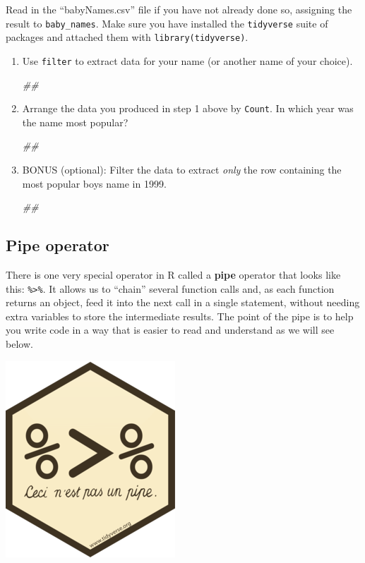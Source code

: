\documentclass[
]{book}
\newenvironment{Shaded}{\begin{snugshade}}{\end{snugshade}}
\newcommand{\CommentTok}[1]{\textcolor[rgb]{0.56,0.35,0.01}{\textit{#1}}}
\begin{document}
Read in the ``babyNames.csv'' file if you have not already done so,
assigning the result to \texttt{baby\_names}. Make sure you have installed
the \texttt{tidyverse} suite of packages and attached them with \texttt{library(tidyverse)}.

\begin{enumerate}
\def\labelenumi{\arabic{enumi}.}
\item
  Use \texttt{filter} to extract data for your name (or another name of your choice).

\begin{Shaded}
\begin{Highlighting}[]
\CommentTok{##}
\end{Highlighting}
\end{Shaded}
\item
  Arrange the data you produced in step 1 above by \texttt{Count}.
  In which year was the name most popular?

\begin{Shaded}
\begin{Highlighting}[]
\CommentTok{##}
\end{Highlighting}
\end{Shaded}
\item
  BONUS (optional): Filter the data to extract \emph{only} the
  row containing the most popular boys name in 1999.

\begin{Shaded}
\begin{Highlighting}[]
\CommentTok{##}
\end{Highlighting}
\end{Shaded}
\end{enumerate}

\hypertarget{pipe-operator}{%
\subsection{Pipe operator}\label{pipe-operator}}

There is one very special operator in R called a \textbf{pipe} operator that
looks like this: \texttt{\%\textgreater{}\%}. It allows us to ``chain'' several function calls and,
as each function returns an object, feed it into the next call in a single
statement, without needing extra variables to store the intermediate
results. The point of the pipe is to help you write code in a way that is
easier to read and understand as we will see below.

\includegraphics{R/Rintro/images/magrittr.png}
\end{document}
